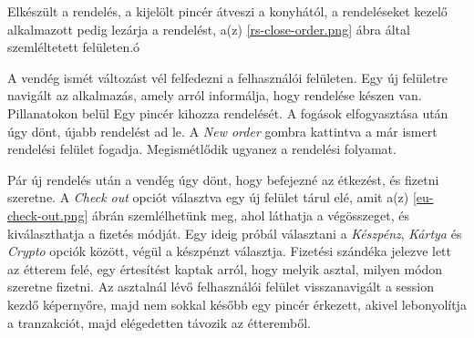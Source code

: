 Elkészült a rendelés, a kijelölt pincér átveszi a konyhától, a rendeléseket kezelő alkalmazott pedig lezárja a rendelést, a(z) \ref{rs-close-order.png} ábra által szemléltetett felületen.ó

A vendég ismét változást vél felfedezni a felhasználói felületen. Egy új felületre navigált az alkalmazás, amely arról informálja, hogy rendelése készen van. Pillanatokon belül Egy pincér kihozza rendelését. A fogások elfogyasztása után úgy dönt, újabb rendelést ad le. A \emph{New order} gombra kattintva a már ismert rendelési felület fogadja. Megismétlődik ugyanez a rendelési folyamat. \par


Pár új rendelés után a vendég úgy dönt, hogy befejezné az étkezést, és fizetni szeretne. A \emph{Check out} opciót választva egy új felület tárul elé, amit a(z) \ref{eu-check-out.png} ábrán szemlélhetünk meg, ahol láthatja a végösszeget, és kiválaszthatja a fizetés módját. Egy ideig próbál választani a \emph{Készpénz}, \emph{Kártya} és \emph{Crypto} opciók között, végül a készpénzt választja. Fizetési szándéka jelezve lett az étterem felé, egy értesítést kaptak arról, hogy melyik asztal, milyen módon szeretne fizetni. Az asztalnál lévő felhasználói felület visszanavigált a session kezdő képernyőre, majd nem sokkal később egy pincér érkezett, akivel lebonyolítja a tranzakciót, majd elégedetten távozik az étteremből.


